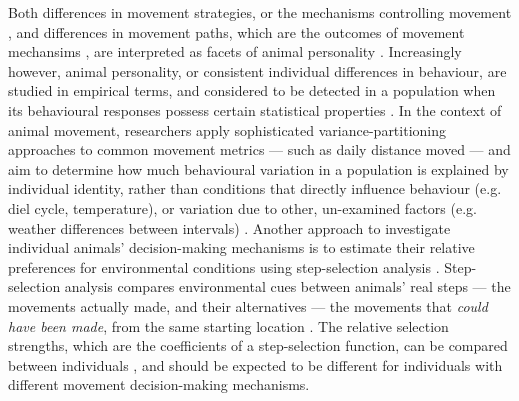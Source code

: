 Both differences in movement strategies, or the mechanisms controlling movement \citep{spiegel2017}, and differences in movement paths, which are the outcomes of movement mechansims \citep{abrahms2017,hertel2021}, are interpreted as facets of animal personality \citep{sih2004,sih2004a}.
Increasingly however, animal personality, or consistent individual differences in behaviour, are studied in empirical terms, and considered to be detected in a population when its behavioural responses possess certain statistical properties \citep{sanchez-tojar2021}.
In the context of animal movement, researchers apply sophisticated variance-partitioning approaches to common movement metrics --- such as daily distance moved --- and aim to determine how much behavioural variation in a population is explained by individual identity, rather than conditions that directly influence behaviour (e.g. diel cycle, temperature), or variation due to other, un-examined factors (e.g. weather differences between intervals) \citep{hertel2020, hertel2019, hertel2021}.
Another approach to investigate individual animals' decision-making mechanisms is to estimate their relative preferences for environmental conditions using step-selection analysis \citep[][see also resource selection analysis: \citealt{manly2007}]{fortin2005,thurfjell2014,avgar2016,signer2019,fieberg2021}.
Step-selection analysis compares environmental cues between animals' real steps --- the movements actually made, and their alternatives --- the movements that \textit{could have been made}, from the same starting location \citep{thurfjell2014,fieberg2021}.
The relative selection strengths, which are the coefficients of a step-selection function, can be compared between individuals \citep{thurfjell2014}, and should be expected to be different for individuals with different movement decision-making mechanisms.

